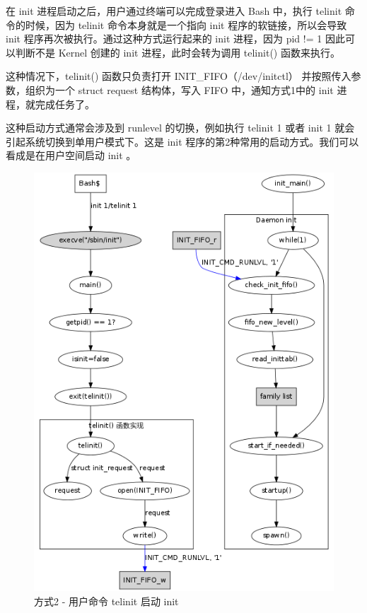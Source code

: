 在 init 进程启动之后，用户通过终端可以完成登录进入 Bash 中，执行 telinit
命令的时候，因为 telinit 命令本身就是一个指向 init
程序的软链接，所以会导致 init 程序再次被执行。通过这种方式运行起来的 init
进程，因为 pid != 1 因此可以判断不是 Kernel 创建的 init
进程，此时会转为调用 telinit() 函数来执行。

这种情况下，telinit() 函数只负责打开 INIT\_FIFO（/dev/initctl）
并按照传入参数，组织为一个 struct request 结构体，写入 FIFO
中，通知方式1中的 init 进程，就完成任务了。

这种启动方式通常会涉及到 runlevel 的切换，例如执行 telinit 1 或者 init 1
就会引起系统切换到单用户模式下。这是 init
程序的第2种常用的启动方式。我们可以看成是在用户空间启动 init 。

\begin{figure}[htbp]
\centering
\includegraphics{./figures/how-to-exec-init-2.png}
\caption{方式2 - 用户命令 telinit 启动 init}
\end{figure}

